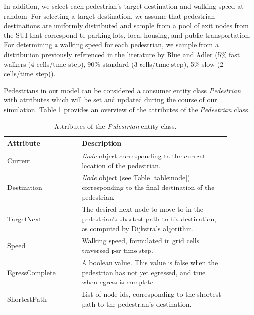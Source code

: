 \documentclass[12pt]{article}
\begin{document}
In addition, we select each pedestrian's target destination and walking
speed at random. For selecting a target destination, we assume that pedestrian
destinations are uniformly distributed and sample from a pool of exit nodes
from the SUI that correspond to parking lots, local housing, and public
transportation. For determining a walking speed for each pedestrian, we sample
from a distribution previously referenced in the literature by Blue and Adler
\cite{blue2001cellular} (5\% fast walkers (4 cells/time step), 90\% standard
(3 cells/time step), 5\% slow (2 cells/time step)).

Pedestrians in our model can be considered a consumer entity class
\textit{Pedestrian} with attributes which will be set and updated during the
course of our simulation. Table \ref{table:ped} provides an overview of the
attributes of the \textit{Pedestrian} class.

\def\arraystretch{1.5}
\begin{table}[hb!]
  \centering
    \begin{tabular}{p{0.3\linewidth}p{0.6\linewidth}}
     \hline
     Attribute & Description \\
     \hline
     Current        & \textit{Node} object corresponding to the current
                      location of the pedestrian. \\
     Destination    & \textit{Node} object (see Table \ref{table:node})
                      corresponding to the final destination of the
                      pedestrian. \\
     TargetNext     & The desired next node to move to in the pedestrian's
                      shortest path to his destination, as computed by
                      Dijkstra's algorithm. \\
     Speed          & Walking speed, formulated in grid cells traversed per
                      time step. \\
     EgressComplete & A boolean value. This value is false when the pedestrian
                      has not yet egressed, and true when egress is complete. \\
     ShortestPath & List of node ids, corresponding to the shortest path to the
                    pedestrian's destination. \\
     \hline
    \end{tabular}
    \caption{Attributes of the \textit{Pedestrian} entity class.}
  \label{table:ped}
\end{table}
\end{document}
